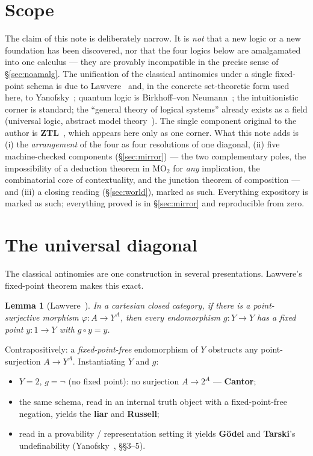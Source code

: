\documentclass[11pt]{article}
\newtheorem{lem}{Lemma}[section]
\theoremstyle{remark}
\begin{document}
\section{Scope}\label{sec:scope}

The claim of this note is deliberately narrow. It is \emph{not} that a new
logic or a new foundation has been discovered, nor that the four logics below
are amalgamated into one calculus --- they are provably incompatible in the
precise sense of \S\ref{sec:noamalg}. The unification of the classical
antinomies under a single fixed-point schema is due to Lawvere~\cite{lawvere}
and, in the concrete set-theoretic form used here, to
Yanofsky~\cite{yanofsky}; quantum logic is Birkhoff--von
Neumann~\cite{bvn}; the intuitionistic corner is standard; the ``general
theory of logical systems'' already exists as a field (universal logic,
abstract model theory~\cite{beziau}). The single component original to the
author is \textbf{ZTL}~\cite{ztl}, which appears here only as one corner.
What this note adds is (i) the \emph{arrangement} of the four as four
resolutions of one diagonal, (ii) five machine-checked components
(\S\ref{sec:mirror}) --- the two complementary poles, the impossibility of
a deduction theorem in $\mathrm{MO}_2$ for \emph{any} implication, the
combinatorial core of contextuality, and the junction theorem of
composition --- and
(iii) a closing reading (\S\ref{sec:world}), marked as such.
Everything expository is marked as such; everything proved is in
\S\ref{sec:mirror} and reproducible from zero.

\section{The universal diagonal}\label{sec:diag}

The classical antinomies are one construction in several presentations.
Lawvere's fixed-point theorem makes this exact.

\begin{lem}[Lawvere~\cite{lawvere}]
In a cartesian closed category, if there is a point-surjective morphism
$\varphi : A \to Y^{A}$, then every endomorphism $g : Y \to Y$ has a fixed
point $y : 1 \to Y$ with $g \circ y = y$.
\end{lem}

Contrapositively: a \emph{fixed-point-free} endomorphism of $Y$ obstructs any
point-surjection $A \to Y^{A}$. Instantiating $Y$ and $g$:

\begin{itemize}
\item $Y = 2$, $g = \neg$ (no fixed point): no surjection $A \to 2^{A}$ ---
\textbf{Cantor};
\item the same schema, read in an internal truth object with a
fixed-point-free negation, yields the \textbf{liar} and \textbf{Russell};
\item read in a provability / representation setting it yields
\textbf{G\"odel} and \textbf{Tarski}'s undefinability
(Yanofsky~\cite{yanofsky}, \S\S3--5).
\end{itemize}
\end{document}
